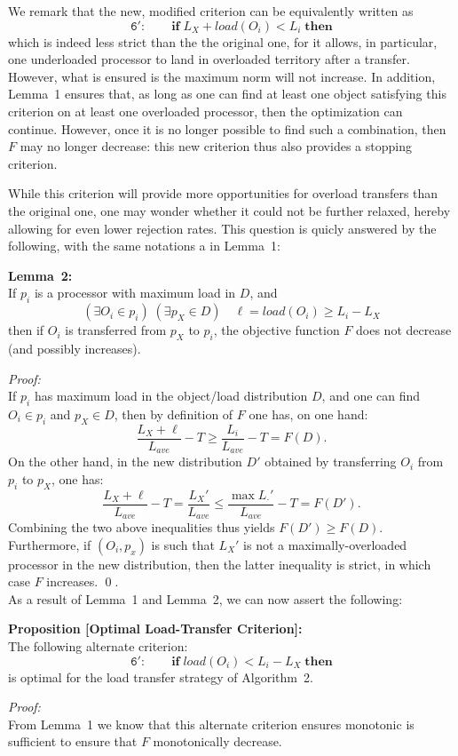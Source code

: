 We remark that the new, modified criterion can be equivalently written
as
\[
\mathtt{6':} \qquad \mathrm{\mathbf{if}} \; L_X + load(O_i) < L_i
\; \mathrm{\mathbf{then}}
\]
which is indeed less strict than the the original one, for it allows,
in particular, one underloaded processor to land in overloaded
territory after a transfer. However, what is ensured is the maximum
norm will not increase.
In addition, Lemma~1 ensures that, as long as one can find at least
one object satisfying this criterion on at least one overloaded
processor, then the optimization can continue. However, once it is no
longer possible to find such a combination, then $F$ may no longer
decrease: this new criterion thus also provides a stopping criterion.

While this criterion will provide more opportunities for overload
transfers than the original one, one may wonder whether it could not
be further relaxed, hereby allowing for even lower rejection rates.
This question is quicly answered by the following, with the same
notations a in Lemma~1:
\par\textbf{Lemma~2:}\\
If $p_i$ is a processor with maximum load in $D$, and
\[
(\exists O_i \in p_i)\; (\exists p_X \in D) \quad \ell = load(O_i) \ge{} L_i - L_X
\]
then if $O_i$ is transferred from $p_X$ to $p_i$, the objective
function $F$ does not decrease (and possibly increases).
\par\textit{Proof:}\\
If $p_i$ has maximum load in the object/load distribution $D$, and one
can find $O_i\in{}p_i$ and $p_X\in{}D$, then by definition of $F$ one
has, on one hand:
\[
\frac{L_X + \ell}{L_{ave}} - T \ge \frac{L_i}{L_{ave}} - T = F(D).
\]
On the other hand, in the new distribution $D'$ obtained by
transferring $O_i$ from $p_i$ to $p_X$, one has:
\[
\frac{L_X + \ell}{L_{ave}} - T = \frac{L_X'}{L_{ave}}
\le \frac{\max{L_{\cdot}'}}{L_{ave}} - T = F(D').
\]
Combining the two above inequalities thus yields
$F(D')\ge{}F(D)$. Furthermore, if $(O_i,p_x)$ is such that $L_X'$ is
not a maximally-overloaded processor in the new distribution, then the
latter inequality is strict, in which case $F$ increases.
\hfill\qed.\\
As a result of Lemma~1 and Lemma~2, we can now assert the following:
\par\textbf{Proposition [Optimal Load-Transfer Criterion]:}\\
The following alternate criterion:
\[
\mathtt{6':} \qquad \mathrm{\mathbf{if}} \; load(O_i) < L_i - L_X
\; \mathrm{\mathbf{then}}
\] 
is optimal for the load transfer strategy of Algorithm~2.
\par\textit{Proof:}\\
From Lemma~1 we know that this alternate criterion ensures monotonic
is sufficient to ensure that $F$ monotonically decrease.


